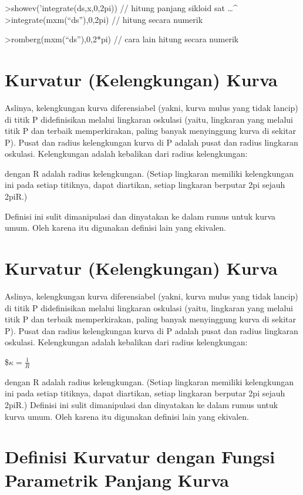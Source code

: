 \documentclass[
]{book}
\begin{document}
\textgreater showev('integrate(ds,x,0,2pi)) // hitung panjang sikloid sat \ldots\^{} \textgreater integrate(mxm(``ds''),0,2pi) // hitung secara numerik

\textgreater romberg(mxm(``ds''),0,2*pi) // cara lain hitung secara numerik\\

\section{Kurvatur (Kelengkungan) Kurva}\label{kurvatur-kelengkungan-kurva}

Aslinya, kelengkungan kurva diferensiabel (yakni, kurva mulus yang tidak lancip) di titik P didefinisikan melalui lingkaran oskulasi (yaitu, lingkaran yang melalui titik P dan terbaik memperkirakan, paling banyak menyinggung kurva di sekitar P). Pusat dan radius kelengkungan kurva di P adalah pusat dan radius lingkaran oskulasi. Kelengkungan adalah kebalikan dari radius kelengkungan:

dengan R adalah radius kelengkungan. (Setiap lingkaran memiliki kelengkungan ini pada setiap titiknya, dapat diartikan, setiap lingkaran berputar 2pi sejauh 2piR.)

Definisi ini sulit dimanipulasi dan dinyatakan ke dalam rumus untuk kurva umum. Oleh karena itu digunakan definisi lain yang ekivalen.

\section{Kurvatur (Kelengkungan) Kurva}\label{kurvatur-kelengkungan-kurva-1}

Aslinya, kelengkungan kurva diferensiabel (yakni, kurva mulus yang tidak lancip) di titik P didefinisikan melalui lingkaran oskulasi (yaitu, lingkaran yang melalui titik P dan terbaik memperkirakan, paling banyak menyinggung kurva di sekitar P). Pusat dan radius kelengkungan kurva di P adalah pusat dan radius lingkaran oskulasi. Kelengkungan adalah kebalikan dari radius kelengkungan:

\$\(\kappa =\frac {1}{R}\)

dengan R adalah radius kelengkungan. (Setiap lingkaran memiliki kelengkungan ini pada setiap titiknya, dapat diartikan, setiap lingkaran berputar 2pi sejauh 2piR.) Definisi ini sulit dimanipulasi dan dinyatakan ke dalam rumus untuk kurva umum. Oleh karena itu digunakan definisi lain yang ekivalen.

\section{Definisi Kurvatur dengan Fungsi Parametrik Panjang Kurva}\label{definisi-kurvatur-dengan-fungsi-parametrik-panjang-kurva}
\end{document}
